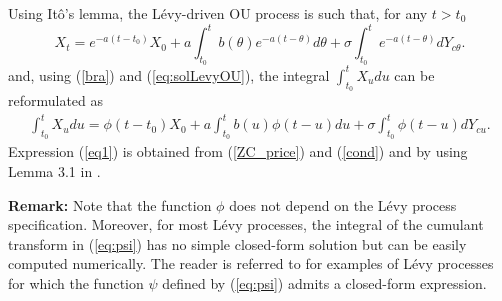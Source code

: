 \proof  
Using It\^o's lemma,  the L\'evy-driven OU process is such that, for any $t>t_0$
\begin{equation}
\label{eq:solLevyOU}
X_t= e^{-a(t-t_0)}X_{0} + a\int_{t_0}^{t}{b(\theta)e^{-a(t-\theta)}d\theta}  + \sigma \int_{t_0}^{t}{e^{-a(t-\theta)}dY_{c \theta}}.
\end{equation}
and, using (\ref{bra}) and (\ref{eq:solLevyOU}), the integral $\int_{t_0}^{t}{X_{u}du}$ can be reformulated as
\begin{eqnarray}
\label{cond}
\int_{t_0}^{t}{X_{u}du}= \phi(t-t_0)X_{0}+a\int_{t_0}^{t}{b(u)\phi(t-u)du} +\sigma\int_{t_0}^{t}{\phi(t-u)dY_{cu}}.
\end{eqnarray}
Expression (\ref{eq1}) is obtained from (\ref{ZC_price}) and (\ref{cond})  and by using Lemma 3.1 in \cite{Eberlein1999}.%
%
\finproof 

\textbf{Remark: } Note that the function $\phi$ does not depend on the L\'evy process specification. Moreover, for most L\'evy processes, the integral of the cumulant transform in (\ref{eq:psi}) has no simple closed-form solution but can be easily computed numerically. The reader is referred to \cite{Hainaut2007} for examples of L\'evy processes for which the function $\psi$ defined by (\ref{eq:psi})  admits a closed-form expression.

